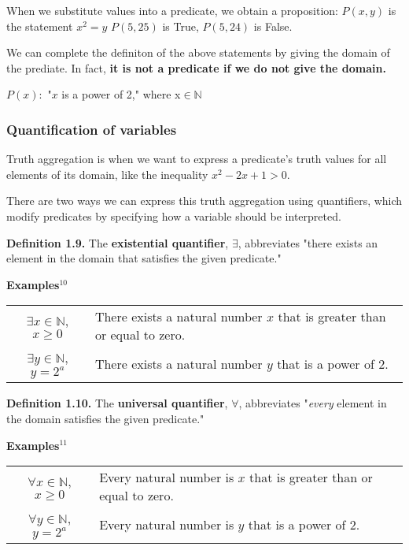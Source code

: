 \documentclass{article}
\begin{document}
When we substitute values into a predicate, we obtain a proposition:
$P(x, y) $ is the statement $x^2 = y$ \hfill $P(5, 25)$ is True, $P(5, 24)$ is False.

We can complete the definiton of the above statements by giving the domain
of the prediate. In fact, \textbf{it is not a predicate if we do not give the domain.}

\begin{center}
$ P(x) : $ "$x$ is a power of 2," \quad where x$ \in \mathbb{N} $
\end{center}

\subsubsection*{Quantification of variables}
Truth aggregation is when we want to express a predicate's truth values for
all elements of its domain, like the inequality $x^2 - 2x + 1 > 0$. 

There are two ways we can express this truth aggregation using quantifiers, 
which modify predicates by specifying how a variable should be interpreted.

\textbf{Definition 1.9.} The \textbf{existential quantifier}, $\exists$, 
abbreviates "there exists an element in the domain that satisfies the
given predicate." 


\textbf{Examples$^{10}$}
\begin{center}
\begin{tabular}{|c p{7.54cm}|}
    $\exists x \in \mathbb{N}$, $x \geq 0$ & There exists a natural number
    $x$ that is greater than or equal to zero. \\
    $\exists y \in \mathbb{N}$, $y = 2^a$  & There exists a natural number 
    $y$ that is a power of 2.
\end{tabular}
\end{center}

\textbf{Definition 1.10.} The \textbf{universal quantifier}, $\forall$,
abbreviates "\emph{every} element in the domain satisfies the given predicate."

\textbf{Examples$^{11}$}
\begin{center}
\begin{tabular}{|c p{7.54cm}|}
    $\forall x \in \mathbb{N}$, $x \geq 0$ & Every natural number is
    $x$ that is greater than or equal to zero. \\
    $\forall y \in \mathbb{N}$, $y = 2^a$  & Every natural number is  
    $y$ that is a power of 2.
\end{tabular}
\end{center}
\end{document}
